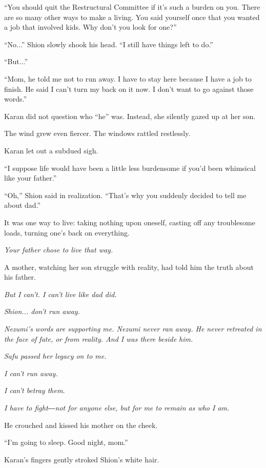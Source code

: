 ``You should quit the Restructural Committee if it's such a burden on
you. There are so many other ways to make a living. You said yourself
once that you wanted a job that involved kids. Why don't you look for
one?''

``No...'' Shion slowly shook his head. ``I still have things left to
do.''

``But...''

``Mom, he told me not to run away. I have to stay here because I have a
job to finish. He said I can't turn my back on it now. I don't want to
go against those words.''

Karan did not question who ``he'' was. Instead, she silently gazed up at
her son.

The wind grew even fiercer. The windows rattled restlessly.

Karan let out a subdued sigh.

\mybreak

``I suppose life would have been a little less burdensome if you'd been
whimsical like your father.''

``Oh,'' Shion said in realization. ``That's why you suddenly decided to
tell me about dad.''

It was one way to live: taking nothing upon oneself, casting off any
troublesome loads, turning one's back on everything.

\emph{Your father chose to live that way.}

A mother, watching her son struggle with reality, had told him the truth
about his father.

\emph{But I can't. I can't live like dad did.}

\myspace

\emph{Shion... don't run away.}

\myspace

\emph{Nezumi's words are supporting me. Nezumi never ran away. He never
retreated in the face of fate, or from reality. And I was there beside
him.}

\emph{Safu passed her legacy on to me.}

\emph{I can't run away.}

\emph{I can't betray them.}

\emph{I have to fight―not for anyone else, but for me to remain as who I am.}

He crouched and kissed his mother on the cheek.

``I'm going to sleep. Good night, mom.''

Karan's fingers gently stroked Shion's white hair.

